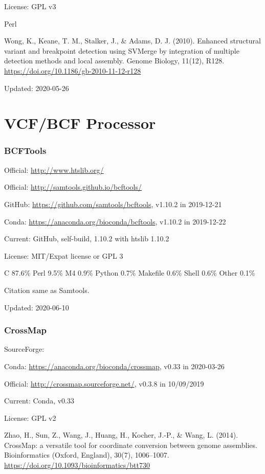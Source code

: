 \documentclass[]{article}
\begin{document}
License: GPL v3

Perl

Wong, K., Keane, T. M., Stalker, J., \& Adams, D. J. (2010). Enhanced structural variant and breakpoint detection using SVMerge by integration of multiple detection methods and local assembly. Genome Biology, 11(12), R128. \url{https://doi.org/10.1186/gb-2010-11-12-r128}

Updated: 2020-05-26

\part{VCF/BCF Processor}

\section{BCFTools}

Official: \url{http://www.htslib.org/}

Official: \url{http://samtools.github.io/bcftools/}

GitHub: \url{https://github.com/samtools/bcftools}, v1.10.2 in 2019-12-21

Conda: \url{https://anaconda.org/bioconda/bcftools}, v1.10.2 in 2019-12-22

Current: GitHub, self-build, 1.10.2 with htslib 1.10.2

License: MIT/Expat license or GPL 3

C 87.6\% Perl 9.5\% M4 0.9\% Python 0.7\% Makefile 0.6\% Shell 0.6\% Other 0.1\%

Citation same as Samtools.

Updated: 2020-06-10

\section{CrossMap}

SourceForge: 

Conda: \url{https://anaconda.org/bioconda/crossmap}, v0.33 in 2020-03-26

Official: \url{http://crossmap.sourceforge.net/}, v0.3.8 in 10/09/2019

Current: Conda, v0.33

License: GPL v2

Zhao, H., Sun, Z., Wang, J., Huang, H., Kocher, J.-P., \& Wang, L. (2014). CrossMap: a versatile tool for coordinate conversion between genome assemblies. Bioinformatics (Oxford, England), 30(7), 1006–1007. \url{https://doi.org/10.1093/bioinformatics/btt730}
\end{document}
